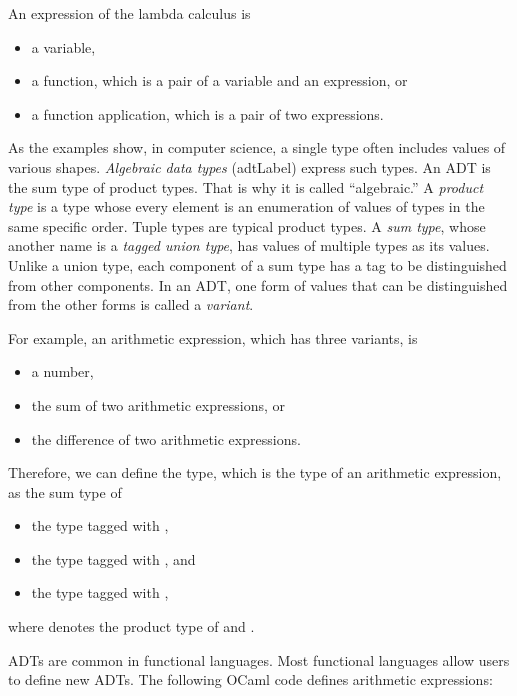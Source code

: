An expression of the lambda calculus is

\begin{itemize}
\item a variable,
\item a function, which is a pair of a variable and an expression, or
\item a function application, which is a pair of two expressions.
\end{itemize}

As the examples show, in computer science, a single type often includes values of
various shapes. \textit{Algebraic data types}
(\acrshort{adtLabel}) express such types. An ADT
is the sum type of product types. That is why it is called ``algebraic.''
A \textit{product type}
is a type whose every element is an enumeration of values of types in the
same specific order. Tuple types are typical product types. A \textit{sum
type}, whose
another name is a \textit{tagged union type},
has values of multiple types as its values. Unlike a union type,
each component of a sum type has a
tag to be distinguished from other components.
In an ADT, one form of values that can be distinguished from the other forms is
called a \textit{variant}.

For example, an arithmetic expression, which has three variants, is

\begin{itemize}
\item a number,
\item the sum of two arithmetic expressions, or
\item the difference of two arithmetic expressions.
\end{itemize}

Therefore, we can define the  type, which is the type of an arithmetic
expression, as the sum type of

\begin{itemize}
\item the  type tagged with ,
\item the  type tagged with , and
\item the  type tagged with ,
\end{itemize}

where  denotes the product type of  and .

ADTs are common in functional languages. Most functional
languages allow users to define new ADTs. The following OCaml
code defines arithmetic expressions:

